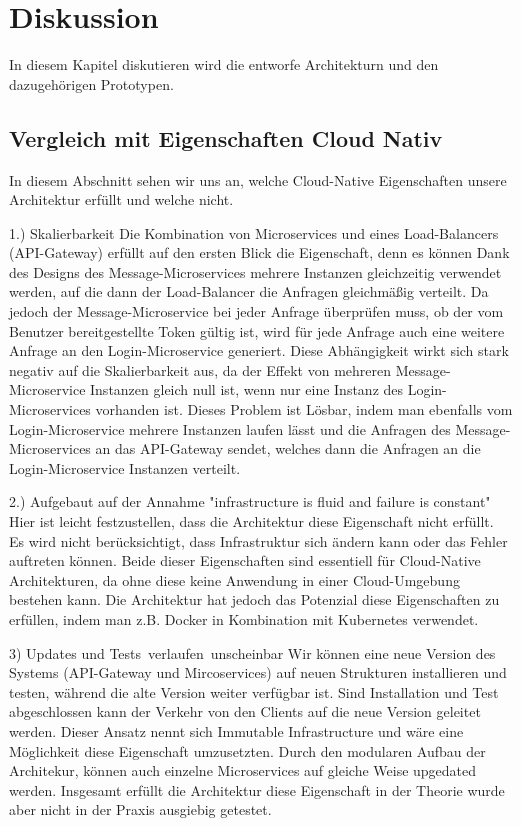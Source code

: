 \chapter{Diskussion}
In diesem Kapitel diskutieren wird die entworfe Architekturn und den dazugehörigen Prototypen.

\section{Vergleich mit Eigenschaften Cloud Nativ}
In diesem Abschnitt sehen wir uns an, welche Cloud-Native Eigenschaften unsere Architektur erfüllt und welche nicht.

1.) Skalierbarkeit
Die Kombination von Microservices und eines Load-Balancers (API-Gateway) erfüllt auf den ersten Blick die Eigenschaft, denn es können Dank des Designs des Message-Microservices mehrere Instanzen gleichzeitig verwendet werden, auf die dann der Load-Balancer die Anfragen gleichmäßig verteilt. Da jedoch der Message-Microservice bei jeder Anfrage überprüfen muss, ob der vom Benutzer bereitgestellte Token gültig ist, wird für jede Anfrage auch eine weitere Anfrage an den Login-Microservice generiert. Diese Abhängigkeit wirkt sich stark negativ auf die Skalierbarkeit aus, da der Effekt von mehreren Message-Microservice Instanzen gleich null ist, wenn nur eine Instanz des Login-Microservices vorhanden ist. Dieses Problem ist Lösbar, indem man ebenfalls vom Login-Microservice mehrere Instanzen laufen lässt und die Anfragen des Message-Microservices an das API-Gateway sendet, welches dann die Anfragen an die Login-Microservice Instanzen verteilt.


2.) Aufgebaut auf der Annahme "infrastructure is fluid and failure is constant"
Hier ist leicht festzustellen, dass die Architektur diese Eigenschaft nicht erfüllt. Es wird nicht berücksichtigt, dass Infrastruktur sich ändern kann oder das Fehler auftreten können. Beide dieser Eigenschaften sind essentiell für Cloud-Native Architekturen, da ohne diese keine Anwendung in einer Cloud-Umgebung bestehen kann. Die Architektur hat jedoch das Potenzial diese Eigenschaften zu erfüllen, indem man z.B. Docker in Kombination mit Kubernetes verwendet.

3) Updates und Tests verlaufen unscheinbar
Wir können eine neue Version des Systems (API-Gateway und Mircoservices) auf neuen Strukturen installieren und testen, während die alte Version weiter verfügbar ist. Sind Installation und Test abgeschlossen kann der Verkehr von den Clients auf die neue Version geleitet werden. Dieser Ansatz nennt sich Immutable Infrastructure und wäre eine Möglichkeit diese Eigenschaft umzusetzten. Durch den modularen Aufbau der Architekur, können auch einzelne Microservices auf gleiche Weise upgedated werden. Insgesamt erfüllt die Architektur diese Eigenschaft in der Theorie wurde aber nicht in der Praxis ausgiebig getestet.


